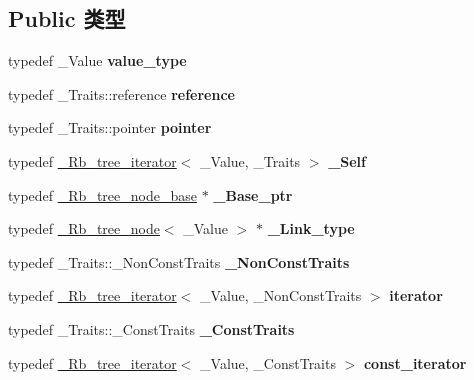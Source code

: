 \subsection*{Public 类型}
\begin{DoxyCompactItemize}
\item 
\mbox{\label{struct___rb__tree__iterator_aca660802f93c97e0d4bb59cd68e2cdb4}} 
typedef \+\_\+\+Value {\bfseries value\+\_\+type}
\item 
\mbox{\label{struct___rb__tree__iterator_ad1f2782480fe40e3d2717c9c276e53cd}} 
typedef \+\_\+\+Traits\+::reference {\bfseries reference}
\item 
\mbox{\label{struct___rb__tree__iterator_a0592086212918604237f9fd0b59e602b}} 
typedef \+\_\+\+Traits\+::pointer {\bfseries pointer}
\item 
\mbox{\label{struct___rb__tree__iterator_a6ad60d296a5d5a4b58111d22a3595ccc}} 
typedef \hyperlink{struct___rb__tree__iterator}{\+\_\+\+Rb\+\_\+tree\+\_\+iterator}$<$ \+\_\+\+Value, \+\_\+\+Traits $>$ {\bfseries \+\_\+\+Self}
\item 
\mbox{\label{struct___rb__tree__iterator_a88c4614585da78e0e1b0220bde59e58b}} 
typedef \hyperlink{struct___rb__tree__node__base}{\+\_\+\+Rb\+\_\+tree\+\_\+node\+\_\+base} $\ast$ {\bfseries \+\_\+\+Base\+\_\+ptr}
\item 
\mbox{\label{struct___rb__tree__iterator_a25685446152f64a82ac7e503a74cdb15}} 
typedef \hyperlink{struct___rb__tree__node}{\+\_\+\+Rb\+\_\+tree\+\_\+node}$<$ \+\_\+\+Value $>$ $\ast$ {\bfseries \+\_\+\+Link\+\_\+type}
\item 
\mbox{\label{struct___rb__tree__iterator_aa1f7d7682383ea45db3b3fe306d83150}} 
typedef \+\_\+\+Traits\+::\+\_\+\+Non\+Const\+Traits {\bfseries \+\_\+\+Non\+Const\+Traits}
\item 
\mbox{\label{struct___rb__tree__iterator_a7fefbbc49adf0c23c25c5c837a0b3ac2}} 
typedef \hyperlink{struct___rb__tree__iterator}{\+\_\+\+Rb\+\_\+tree\+\_\+iterator}$<$ \+\_\+\+Value, \+\_\+\+Non\+Const\+Traits $>$ {\bfseries iterator}
\item 
\mbox{\label{struct___rb__tree__iterator_a571e7262423f75b8aa53747e8d12c62d}} 
typedef \+\_\+\+Traits\+::\+\_\+\+Const\+Traits {\bfseries \+\_\+\+Const\+Traits}
\item 
\mbox{\label{struct___rb__tree__iterator_adc4b3deb023f4327ae11756c3c290dc0}} 
typedef \hyperlink{struct___rb__tree__iterator}{\+\_\+\+Rb\+\_\+tree\+\_\+iterator}$<$ \+\_\+\+Value, \+\_\+\+Const\+Traits $>$ {\bfseries const\+\_\+iterator}
\end{DoxyCompactItemize}
